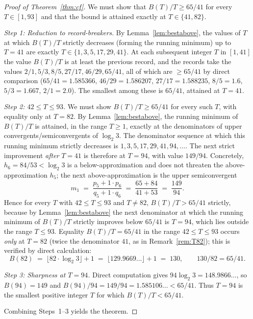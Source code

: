 \documentclass[11pt,a4paper]{article}
\theoremstyle{definition}
\theoremstyle{remark}
\begin{document}
\begin{proof}[Proof of Theorem~\ref{thm:cf}]
We must show that $B(T)/T \geq 65/41$ for every $T \in [1, 93]$ and
that the bound is attained exactly at $T \in \{41, 82\}$.

\emph{Step 1: Reduction to record-breakers.}  By
Lemma~\ref{lem:bestabove}, the values of $T$ at which $B(T)/T$
strictly decreases (forming the running minimum) up to $T = 41$ are
exactly $T \in \{1, 3, 5, 17, 29, 41\}$.  At each subsequent integer
$T$ in $[1, 41]$ the value $B(T)/T$ is at least the previous record,
and the records take the values
$2/1, 5/3, 8/5, 27/17, 46/29, 65/41$, all of which are
$\geq 65/41$ by direct comparison
($65/41 = 1.585366$, $46/29 = 1.586207$, $27/17 = 1.588235$,
$8/5 = 1.6$, $5/3 = 1.667$, $2/1 = 2.0$).  The smallest among these
is $65/41$, attained at $T = 41$.

\emph{Step 2: $42 \leq T \leq 93$.}  We must show
$B(T)/T \geq 65/41$ for every such $T$, with equality only at $T = 82$.
By Lemma~\ref{lem:bestabove}, the running minimum of $B(T)/T$ is
attained, in the range $T \geq 1$, exactly at the denominators of
upper convergents/semiconvergents of $\log_2 3$.  The denominator
sequence at which this running minimum strictly decreases is
$1, 3, 5, 17, 29, 41, 94, \ldots$.  The next strict improvement
\emph{after} $T = 41$ is therefore at $T = 94$, with value $149/94$.
Concretely, $h_6 = 84/53 < \log_2 3$ is a below-approximation and
does not threaten the above-approximation $h_5$; the next
above-approximation is the upper semiconvergent
\[
  m_1 \;=\; \frac{p_5 + 1 \cdot p_6}{q_5 + 1 \cdot q_6}
       \;=\; \frac{65 + 84}{41 + 53}
       \;=\; \frac{149}{94}.
\]
Hence for every $T$ with $42 \leq T \leq 93$ and $T \neq 82$,
$B(T)/T > 65/41$ strictly, because by Lemma~\ref{lem:bestabove}
the next denominator at which the running minimum of $B(T)/T$
strictly improves below $65/41$ is $T = 94$, which lies outside
the range $T \leq 93$.  Equality $B(T)/T = 65/41$
in the range $42 \leq T \leq 93$ occurs \emph{only} at $T = 82$
(twice the denominator $41$, as in Remark~\ref{rem:T82}); this is
verified by direct calculation:
\[
  B(82) \;=\; \lfloor 82 \cdot \log_2 3 \rfloor + 1
   \;=\; \lfloor 129.9669\ldots \rfloor + 1
   \;=\; 130, \qquad 130/82 = 65/41.
\]

\emph{Step 3: Sharpness at $T = 94$.}  Direct computation gives
$94 \log_2 3 = 148.9866\ldots$, so $B(94) = 149$ and
$B(94)/94 = 149/94 = 1.585106\ldots < 65/41$.  Thus $T = 94$ is the
smallest positive integer $T$ for which $B(T)/T < 65/41$.

Combining Steps~1--3 yields the theorem.
\end{proof}
\end{document}
